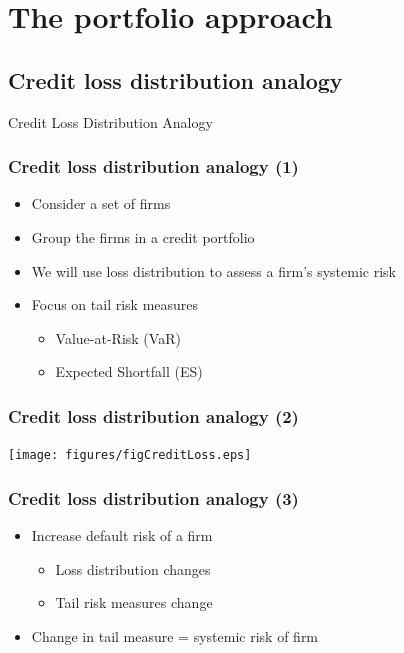 \documentclass[aspectratio=43,dvipsnames,usenames, svgnames]{beamer}
\begin{document}
\section{The portfolio approach}

\subsection{Credit loss distribution analogy}

\begin{frame} %
\begin{center} 
	\Large{Credit Loss Distribution Analogy}
\end{center}
\end{frame}

\begin{frame} %
\frametitle{Credit loss distribution analogy (1)}
	\begin{itemize}
		\item Consider a set of firms
		\smallskip
		\item Group the firms in a credit portfolio
		\smallskip
		\item We will use loss distribution to assess a firm's systemic risk
		\smallskip
		\item Focus on tail risk measures
		\begin{itemize}
			\item Value-at-Risk (VaR)
			\item Expected Shortfall (ES)
		\end{itemize}
	\end{itemize}
\end{frame}

\begin{frame} %
\frametitle{Credit loss distribution analogy (2)}
\begin{center}
	\texttt{[image: figures/figCreditLoss.eps]}
\end{center}
\end{frame}

\begin{frame} %
\frametitle{Credit loss distribution analogy (3)}
	\begin{itemize}
		\item Increase default risk of a firm
		\begin{itemize}
			\item Loss distribution changes
			\item Tail risk measures change			
		\end{itemize}
		\smallskip
		\item Change in tail measure = systemic risk of firm
	\end{itemize}
\end{frame}
\end{document}
